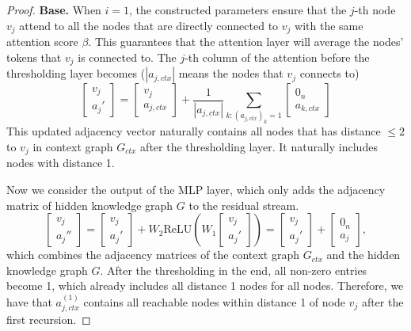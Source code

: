 \documentclass[]{bytedance_seed}
\newcommand{\1}{\mathbf{1}}
\begin{document}
\begin{proof}
    \textbf{Base.} When $i=1$, the constructed parameters ensure that the $j$-th node $v_j$ attend to all the nodes that are directly connected to $v_j$ with the same attention score $\beta$. This guarantees that the attention layer will average the nodes' tokens that $v_j$ is connected to. The $j$-th column of the attention before the thresholding layer becomes ($|a_{j,ctx}|$ means the nodes that $v_j$ connects to)
    $$\begin{bmatrix}
        v_j\\
        a_{j}'
    \end{bmatrix}=\begin{bmatrix}
        v_j\\
        a_{j,ctx}
    \end{bmatrix}+\frac{1}{|a_{j,ctx}|}\sum_{k:(a_{j,ctx})_k=1}\begin{bmatrix}
        0_n\\
        a_{k,ctx}
    \end{bmatrix}$$
    This updated adjacency vector naturally contains all nodes that has distance $\le 2$ to $v_j$ in context graph $G_{ctx}$ after the thresholding layer. It naturally includes nodes with distance 1.

    Now we consider the output of the MLP layer, which only adds the adjacency matrix of hidden knowledge graph $G$ to the residual stream.
    $$\begin{bmatrix}
        v_j\\
        a_{j}''
    \end{bmatrix}=\begin{bmatrix}
        v_j\\
        a_{j}'
    \end{bmatrix}+W_2\mathrm{ReLU}\left(W_1\begin{bmatrix}
        v_j\\
        a_{j}'
    \end{bmatrix}\right)=\begin{bmatrix}
        v_j\\
        a_{j}'
    \end{bmatrix}+\begin{bmatrix}
        0_n\\
        a_{j}
    \end{bmatrix},$$
which combines the adjacency matrices of the context graph $G_{ctx}$ and the hidden knowledge graph $G$. After the thresholding in the end, all non-zero entries become 1, which already includes all distance 1 nodes for all nodes. Therefore, we have that $a_{j,ctx}^{(1)}$ contains all reachable nodes within distance 1 of node $v_j$ after the first recursion.


\end{proof}
\end{document}
